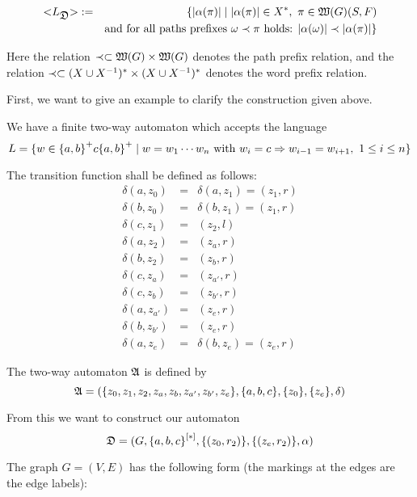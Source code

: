 \begin{definition}
\begin{eqnarray*}
\mbox{${<}{L_{\mbox{$\mathfrak{D}$}}}{>}$} &:=& \{ |\alpha(\pi)| \mid  |\alpha(\pi)| \in
X^*,\ \pi \in \mbox{$\mathfrak{W}({G})$}(S, F) \\
&& \text{and for all paths prefixes }\omega \prec \pi \text{ holds: }
|\alpha(\omega)| \prec |\alpha(\pi)| \}
\end{eqnarray*}

Here the relation $\prec \subset \mbox{$\mathfrak{W}({G})$} \times \mbox{$\mathfrak{W}({G})$}$ denotes the
path prefix relation, and the relation $\prec \subset (X \cup {X}^{-1})^* \times
(X \cup {X}^{-1})^*$ denotes the word prefix relation.
\end{definition}

\bigskip
First, we want to give an example to clarify the construction given above.

We have a finite two-way automaton which accepts the language
\[ L = \mbox{$\{w \in \mbox{$\{a, b\}$}^+ c \mbox{$\{a, b\}$}^+ \mid w = w_1 \cdots w_n
\text{ with } w_i = c \Rightarrow w_{i-1} = w_{i+1},\ 1 \leq i \leq n\}$} \]

The transition function shall be defined as follows:
\begin{eqnarray*}
\delta(a, z_0) &=& \delta(a, z_1) = (z_1, r) \\
\delta(b, z_0) &=& \delta(b, z_1) = (z_1, r) \\
\delta(c, z_1) &=& (z_2, l) \\
\delta(a, z_2) &=& (z_a, r) \\
\delta(b, z_2) &=& (z_b, r) \\
\delta(c, z_a) &=& (z_{a'}, r) \\
\delta(c, z_b) &=& (z_{b'}, r) \\
\delta(a, z_{a'}) &=& (z_e, r) \\
\delta(b, z_{b'}) &=& (z_e, r) \\
\delta(a, z_{e}) &=& \delta(b, z_e) = (z_e, r)
\end{eqnarray*}

The two-way automaton $\mbox{$\mathfrak{A}$}$ is defined by
\[ \mbox{$\mathfrak{A}$} = (\mbox{$\{z_0, z_1, z_2, z_a, z_b, z_{a'}, z_{b'}, z_e\}$}, \mbox{$\{a,
b, c\}$}, \mbox{$\{z_0\}$}, \mbox{$\{z_e\}$}, \delta) \]

From this we want to construct our automaton 
\[ \mbox{$\mathfrak{D}$} = (G, \mbox{${\mbox{$\{a, b, c\}$}}^{[*]}$}, \mbox{$\{(z_0, r_2)\}$}, \mbox{$\{(z_e,
r_2)\}$}, \alpha) \]

The graph $G = (V, E)$ has the following form (the markings at the edges are
the edge labels):

